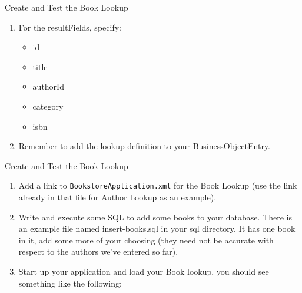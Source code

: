 \documentclass[xcolor=dvipsnames,14pt,professionalfonts]{beamer}
\begin{document}
        \begin{frame}{Create and Test the Book Lookup}
          \begin{enumerate}
          \item For the resultFields, specify:
            \begin{itemize}
              \item id
            \item title
            \item authorId
            \item category
            \item isbn
            \end{itemize}
          \item Remember to add the lookup definition to your
            BusinessObjectEntry.
            \end{enumerate}
          \end{frame}
          
          \begin{frame}{Create and Test the Book Lookup}
            \begin{enumerate}
              \item Add a link to \texttt{BookstoreApplication.xml} for the Book Lookup (use the link already in that file for Author Lookup as an example).
              \item Write and execute some SQL to add some books to your database.  There is an example file named insert-books.sql in your sql directory.  It has one book in it, add some more of your choosing (they need not be accurate with respect to the authors we’ve entered so far).
              \item Start up your application and load your Book
                lookup, you should see something like the following:
              \end{enumerate}
            \end{frame}
\end{document}
